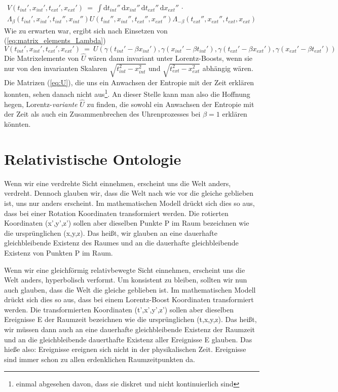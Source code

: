 \documentclass[12pt]{article}
\begin{document}
\begin{equation}
\begin{split}
V(t_{int}',x_{int}',t_{ext}',x_{ext}')\ =\ 
\int \mathrm{d}t_{int}''\,\mathrm{d}x_{int}''\, \mathrm{d}t_{ext}''\,\mathrm{d}x_{ext}''\, \cdot
\\
\Lambda_\beta(t_{int}',x_{int}',t_{int}'',x_{int}'') 
U(t_{int}'',x_{int}'',t_{ext}'',x_{ext}'') 
\Lambda_{-\beta}(t_{ext}'',x_{ext}'',t_{ext},x_{ext})
\end{split}
\end{equation}
Wie zu erwarten war, ergibt sich nach Einsetzen von (\ref{eq:matrix_elements_Lambda})
\begin{equation}
V(t_{int}',x_{int}',t_{ext}',x_{ext}')\ =\ 
U(\gamma(t_{int}'-\beta x_{int}'),
\gamma(x_{int}'-\beta t_{int}'),
\gamma(t_{ext}'-\beta x_{ext}'),
\gamma(x_{ext}'-\beta t_{ext}')) 
\end{equation}
Die Matrixelemente von $\hat{U}$ wären dann invariant unter Lorentz-Boosts, wenn sie nur von den invarianten Skalaren $\sqrt{t_{int}^2-x_{int}^2}$ und $\sqrt{t_{ext}^2-x_{ext}^2}$ abhängig wären. Die Matrizen (\ref{eq:U}), die uns ein Anwachsen der Entropie mit der Zeit erklären konnten, sehen danach nicht aus\footnote{einmal abgesehen davon, dass sie diskret und nicht kontinuierlich sind}. An dieser Stelle kann man also die Hoffnung hegen, Lorentz-\emph{variante} $\hat{U}$ zu finden, die sowohl ein Anwachsen der Entropie mit der Zeit als auch ein Zusammenbrechen des Uhrenprozesses bei $\beta=1$ erklären könnten.

\section{Relativistische Ontologie}

Wenn wir eine verdrehte Sicht einnehmen, erscheint uns die Welt anders, verdreht. Dennoch glauben wir, dass die Welt nach wie vor die gleiche geblieben ist, uns nur anders erscheint. Im mathematischen Modell drückt sich dies so aus, dass bei einer Rotation Koordinaten transformiert werden. Die rotierten Koordinaten (x',y',z') sollen aber dieselben Punkte P im Raum bezeichnen wie die ursprünglichen (x,y,z). Das heißt, wir glauben an eine dauerhafte gleichbleibende Existenz des Raumes und an die dauerhafte gleichbleibende Existenz von Punkten P im Raum. 

Wenn wir eine gleichförmig relativbewegte Sicht einnehmen, erscheint uns die Welt anders, hyperbolisch verformt. Um konsistent zu bleiben, sollten wir nun auch glauben, dass die Welt die gleiche geblieben ist. Im mathematischen Modell drückt sich dies so aus, dass bei einem Lorentz-Boost Koordinaten transformiert werden. Die transformierten Koordinaten (t',x',y',z') sollen aber dieselben Ereignisse E der Raumzeit bezeichnen wie die ursprünglichen (t,x,y,z). Das heißt, wir müssen dann auch an eine dauerhafte gleichbleibende Existenz der Raumzeit und an die gleichbleibende dauerthafte Existenz aller Ereignisse E glauben. Das hieße also: Ereignisse ereignen sich nicht in der physikalischen Zeit. Ereignisse sind immer schon zu allen erdenklichen Raumzeitpunkten da.
\end{document}
